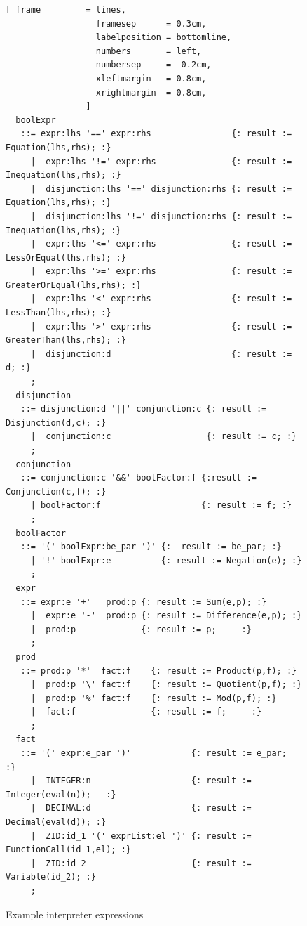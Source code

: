 \begin{figure}[!ht]

\begin{Verbatim}[ frame         = lines, 
                  framesep      = 0.3cm, 
                  labelposition = bottomline,
                  numbers       = left,
                  numbersep     = -0.2cm,
                  xleftmargin   = 0.8cm,
                  xrightmargin  = 0.8cm,
                ]
  boolExpr 
   ::= expr:lhs '==' expr:rhs                {: result := Equation(lhs,rhs); :}
     |  expr:lhs '!=' expr:rhs               {: result := Inequation(lhs,rhs); :}
     |  disjunction:lhs '==' disjunction:rhs {: result := Equation(lhs,rhs); :}
     |  disjunction:lhs '!=' disjunction:rhs {: result := Inequation(lhs,rhs); :}
     |  expr:lhs '<=' expr:rhs               {: result := LessOrEqual(lhs,rhs); :}
     |  expr:lhs '>=' expr:rhs               {: result := GreaterOrEqual(lhs,rhs); :}
     |  expr:lhs '<' expr:rhs                {: result := LessThan(lhs,rhs); :}
     |  expr:lhs '>' expr:rhs                {: result := GreaterThan(lhs,rhs); :}
     |  disjunction:d                        {: result := d; :}
     ;
  disjunction
   ::= disjunction:d '||' conjunction:c {: result := Disjunction(d,c); :}
     |  conjunction:c                   {: result := c; :}
     ;
  conjunction
   ::= conjunction:c '&&' boolFactor:f {:result := Conjunction(c,f); :}
     | boolFactor:f                    {: result := f; :}
     ;
  boolFactor
   ::= '(' boolExpr:be_par ')' {:  result := be_par; :}
     | '!' boolExpr:e          {: result := Negation(e); :}
     ;
  expr 
   ::= expr:e '+'   prod:p {: result := Sum(e,p); :} 
     |  expr:e '-'  prod:p {: result := Difference(e,p); :} 
     |  prod:p             {: result := p;     :}
     ;
  prod 
   ::= prod:p '*'  fact:f    {: result := Product(p,f); :}
     |  prod:p '\' fact:f    {: result := Quotient(p,f); :} 
     |  prod:p '%' fact:f    {: result := Mod(p,f); :} 
     |  fact:f               {: result := f;     :}
     ;
  fact 
   ::= '(' expr:e_par ')'            {: result := e_par;   :} 
     |  INTEGER:n                    {: result := Integer(eval(n));   :} 
     |  DECIMAL:d                    {: result := Decimal(eval(d)); :}
     |  ZID:id_1 '(' exprList:el ')' {: result := FunctionCall(id_1,el); :}
     |  ZID:id_2                     {: result := Variable(id_2); :}
     ;
		\end{Verbatim}
\caption{Example interpreter expressions}
\label{fig:example_interpreter_grammar_expression}
\end{figure}
